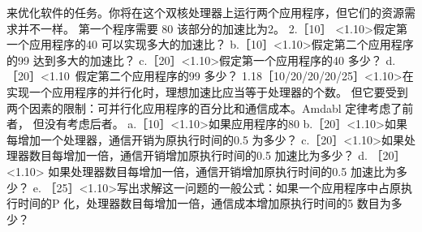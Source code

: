 来优化软件的任务。你将在这个双核处理器上运行两个应用程序，但它们的资源需求并不一样。
第一个程序需要 80%
该部分的加速比为2。
2.［10］ <1.10>假定第一个应用程序的40%
可以实现多大的加速比？
b.［10］<1.10>假定第二个应用程序的99%
达到多大的加速比？
c.［20］<1.10>假定第一个应用程序的40%
多少？
d. ［20］<1.10~假定第二个应用程序的99%
多少？
1.18［10/20/20/20/25］<1.10>在实现一个应用程序的并行化时，理想加速比应当等于处理器的个数。
但它要受到两个因素的限制：可并行化应用程序的百分比和通信成本。Amdabl 定律考虑了前者，
但没有考虑后者。
a.［10］<1.10>如果应用程序的80%
b.［20］<1.10>如果每增加一个处理器，通信开销为原执行时间的0.5%
 为多少？
c.［20］<1.10>如果处理器数目每增加一倍，通信开销增加原执行时间的0.5%
加速比为多少？
d. ［20］<1.10> 如果处理器数目每增加一倍，通信开销增加原执行时间的0.5%
加速比为多少？
e. ［25］<1.10>写出求解这一问题的一般公式：如果一个应用程序中占原执行时间的P%
化，处理器数目每增加一倍，通信成本增加原执行时间的5%
数目为多少？
